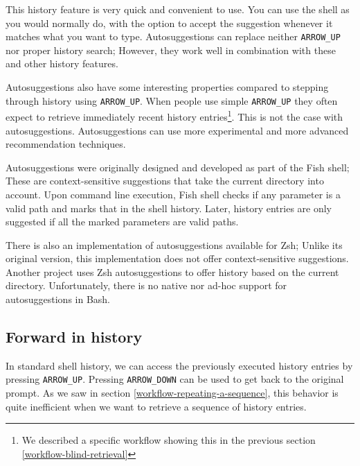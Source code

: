 This history feature is very quick and convenient to use. You can use the shell as you would normally do, with the option to accept the suggestion whenever it matches what you want to type. Autosuggestions can replace neither \verb|ARROW_UP| nor proper history search; However, they work well in combination with these and other history features.

Autosuggestions also have some interesting properties compared to stepping through history using \verb|ARROW_UP|.
When people use simple \verb|ARROW_UP| they often expect to retrieve immediately recent history entries\footnote{We described a specific workflow showing this in the previous section \ref{workflow-blind-retrieval}}. This is not the case with autosuggestions. %
Autosuggestions can use more experimental and more advanced recommendation techniques.

Autosuggestions were originally designed and developed as part of the Fish\cite{fishdocs} shell; These are context-sensitive suggestions that take the current directory into account. Upon command line execution, Fish shell checks if any parameter is a valid path and marks that in the shell history. Later, history entries are only suggested if all the marked parameters are valid paths\cite{toolsfishissueautosuggestions}.

There is also an implementation of autosuggestions available for Zsh\cite{toolszshautosuggestions}; Unlike its original version, this implementation does not offer context-sensitive suggestions. Another project\cite{toolszshhistdb} uses Zsh autosuggestions to offer history based on the current directory.
Unfortunately, there is no native nor ad-hoc support for autosuggestions in Bash. 



\subsection{Forward in history}

In standard shell history, we can access the previously executed history entries by pressing \verb|ARROW_UP|. Pressing \verb|ARROW_DOWN| can be used to get back to the original prompt.
As we saw in section \ref{workflow-repeating-a-sequence}, this behavior is quite inefficient when we want to retrieve a sequence of history entries.

